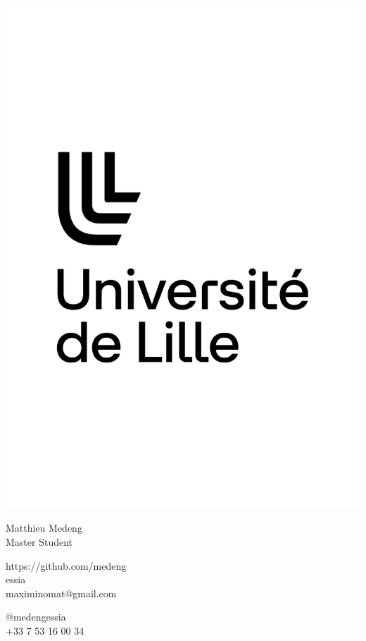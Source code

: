 \documentclass{article}
\begin{document}
\centering \includegraphics[width=.25\linewidth]{logo}\\[5pt]
\parbox{2in}{\Large \centering Matthieu Medeng\\[1pt]
\normalsize Master Student}

\vfill
\raggedright
\begin{multicols}{2}
https://github.com/medeng\\
essia\\
maximinomat@gmail.com

\columnbreak
\raggedleft
@medengessia\\
+33 7 53 16 00 34%
\end{multicols}%
\end{document}

